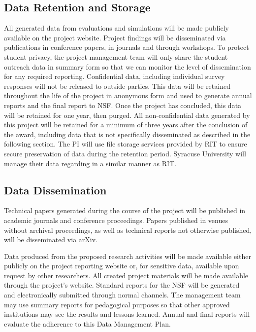 \documentclass[11pt]{article}
\begin{document}
\subsection*{Data Retention and Storage}
All generated data from evaluations and simulations will be made publicly available on the project website. Project findings will be disseminated via publications in conference papers, in journals and through workshops. To protect student privacy, the project management team will only share the student outreach data in summary form so that we can monitor the level of dissemination for any required reporting. Confidential data, including individual survey responses will not be released to outside parties. This data will be retained throughout the life of the project in anonymous form and used to generate annual reports and the final report to NSF. Once the project has concluded, this data will be retained for one year, then purged. All non-confidential data generated by this project will be retained for a minimum of three years after the conclusion of the award, including data that is not specifically disseminated as described in the following section. The PI will use file storage services provided by RIT to ensure secure preservation of data during the retention period. Syracuse University will manage their data regarding in a similar manner as RIT.





\subsection*{Data Dissemination}

Technical papers generated during the course of the project will be published in academic journals and conference proceedings. Papers published in venues without archival proceedings, as well as technical reports not otherwise published, will be disseminated via arXiv.


Data produced from the proposed research activities will be made available either publicly on the project reporting website or, for sensitive data, available upon request by other researchers. All created project materials will be made available through the project's website. Standard reports for the NSF will be generated and electronically submitted through normal channels. The management team may use summary reports for pedagogical purposes so that other approved institutions may see the results and lessons learned. Annual and final reports will evaluate the adherence to this Data Management Plan. %
\end{document}
